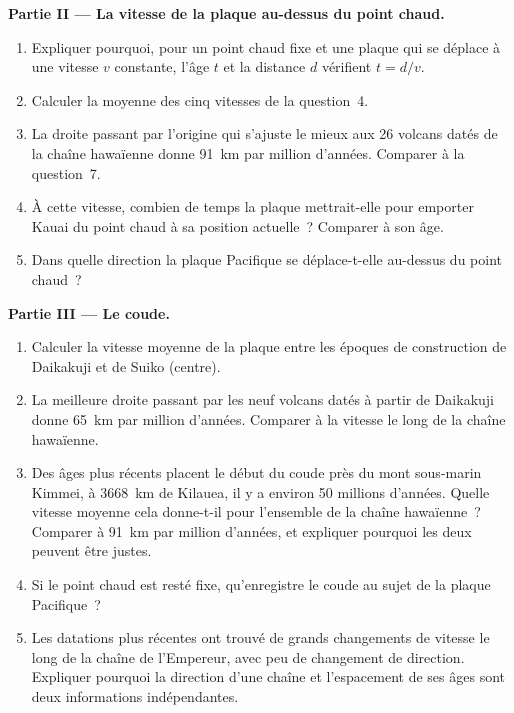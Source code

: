 \begin{problem}
\medskip
\noindent\textbf{Partie II --- La vitesse de la plaque au-dessus du point chaud.}
\begin{enumerate}[resume]
  \item Expliquer pourquoi, pour un point chaud fixe et une plaque qui se
        déplace à une vitesse $v$ constante, l'âge $t$ et la distance $d$
        vérifient $t = d/v$.
  \item Calculer la moyenne des cinq vitesses de la question~4.
  \item La droite passant par l'origine qui s'ajuste le mieux aux 26
        volcans datés de la chaîne hawaïenne donne \qty{91}{km} par million
        d'années. Comparer à la question~7.
  \item À cette vitesse, combien de temps la plaque mettrait-elle pour
        emporter Kauai du point chaud à sa position actuelle~? Comparer à
        son âge.
  \item Dans quelle direction la plaque Pacifique se déplace-t-elle
        au-dessus du point chaud~?
\end{enumerate}

\medskip
\noindent\textbf{Partie III --- Le coude.}
\begin{enumerate}[resume]
  \item Calculer la vitesse moyenne de la plaque entre les époques de
        construction de Daikakuji et de Suiko (centre).
  \item La meilleure droite passant par les neuf volcans datés à partir de
        Daikakuji donne \qty{65}{km} par million d'années. Comparer à la
        vitesse le long de la chaîne hawaïenne.
  \item Des âges plus récents placent le début du coude près du mont
        sous-marin Kimmei, à \qty{3668}{km} de Kilauea, il y a environ
        50 millions d'années. Quelle vitesse moyenne cela donne-t-il pour
        l'ensemble de la chaîne hawaïenne~? Comparer à \qty{91}{km} par
        million d'années, et expliquer pourquoi les deux peuvent être
        justes.
  \item Si le point chaud est resté fixe, qu'enregistre le coude au sujet
        de la plaque Pacifique~?
  \item Les datations plus récentes ont trouvé de grands changements de
        vitesse le long de la chaîne de l'Empereur, avec peu de changement
        de direction. Expliquer pourquoi la direction d'une chaîne et
        l'espacement de ses âges sont deux informations indépendantes.
\end{enumerate}


\end{problem}
